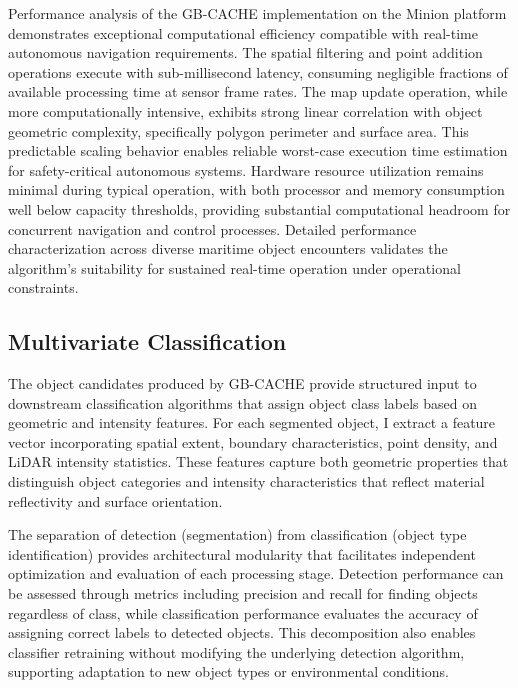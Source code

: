 \documentclass{erauthesis}
\begin{document}
Performance analysis of the \ac{GB-CACHE} implementation on the Minion platform demonstrates exceptional computational efficiency compatible with real-time autonomous navigation requirements.
The spatial filtering and point addition operations execute with sub-millisecond latency, consuming negligible fractions of available processing time at sensor frame rates.
The map update operation, while more computationally intensive, exhibits strong linear correlation with object geometric complexity, specifically polygon perimeter and surface area.
This predictable scaling behavior enables reliable worst-case execution time estimation for safety-critical autonomous systems.
Hardware resource utilization remains minimal during typical operation, with both processor and memory consumption well below capacity thresholds, providing substantial computational headroom for concurrent navigation and control processes.
Detailed performance characterization across diverse maritime object encounters validates the algorithm's suitability for sustained real-time operation under operational constraints.

\subsection{Multivariate Classification} \label{sec:gbcache_mvg_classification}

The object candidates produced by \ac{GB-CACHE} provide structured input to downstream classification algorithms that assign object class labels based on geometric and intensity features.
For each segmented object, I extract a feature vector incorporating spatial extent, boundary characteristics, point density, and \ac{LiDAR} intensity statistics.
These features capture both geometric properties that distinguish object categories and intensity characteristics that reflect material reflectivity and surface orientation.

The separation of detection (segmentation) from classification (object type identification) provides architectural modularity that facilitates independent optimization and evaluation of each processing stage.
Detection performance can be assessed through metrics including precision and recall for finding objects regardless of class, while classification performance evaluates the accuracy of assigning correct labels to detected objects.
This decomposition also enables classifier retraining without modifying the underlying detection algorithm, supporting adaptation to new object types or environmental conditions.
\end{document}
